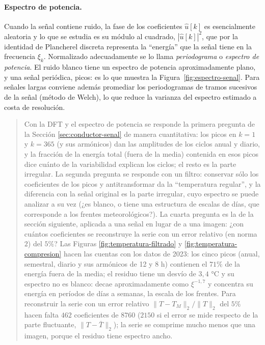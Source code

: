 \documentclass[12pt, a4paper]{amsbook}
\theoremstyle{remark}
\theoremstyle{definition}
\numberwithin{section}{chapter}
\numberwithin{subsection}{section}
\numberwithin{equation}{section}
\numberwithin{figure}{chapter}
\newenvironment{volvemos}[1]{\medskip\par\noindent\begin{quote}\noindent{\bf Volvemos al problema: #1.}\par\smallskip}{\end{quote}\medskip}
\begin{document}
\paragraph{Espectro de potencia.} Cuando la señal contiene ruido, la fase de los coeficientes $\hat u[k]$ es esencialmente aleatoria y lo que se estudia es su módulo al cuadrado, $|\hat u[k]|^2$, que por la identidad de Plancherel discreta representa la ``energía'' que la señal tiene en la frecuencia $\xi_k$. Normalizado adecuadamente se lo llama \emph{periodograma} o \emph{espectro de potencia}. El ruido blanco tiene un espectro de potencia aproximadamente plano, y una señal periódica, picos: es lo que muestra la Figura~\ref{fig:espectro-senal}. Para señales largas conviene además promediar los periodogramas de tramos sucesivos de la señal (método de Welch), lo que reduce la varianza del espectro estimado a costa de resolución.

\begin{volvemos}{la señal de temperatura}
Con la DFT y el espectro de potencia se responde la primera pregunta de la Sección \ref{sec:conductor-senal} de manera cuantitativa: los picos en $k=1$ y $k=365$ (y sus armónicos) dan las amplitudes de los ciclos anual y diario, y la fracción de la energía total (fuera de la media) contenida en esos picos dice cuánto de la variabilidad explican los ciclos; el resto es la parte irregular. La segunda pregunta se responde con un filtro: conservar sólo los coeficientes de los picos y antitransformar da la ``temperatura regular'', y la diferencia con la señal original es la parte irregular, cuyo espectro se puede analizar a su vez (¿es blanco, o tiene una estructura de escalas de días, que corresponde a los frentes meteorológicos?). La cuarta pregunta es la de la sección siguiente, aplicada a una señal en lugar de a una imagen: ¿con cuántos coeficientes se reconstruye la serie con un error relativo (en norma $2$) del $5\%$?
Las Figuras \ref{fig:temperatura-filtrado} y \ref{fig:temperatura-compresion} hacen las cuentas con los datos de 2023: los cinco picos (anual, semestral, diario y sus armónicos de 12 y 8 h) contienen el $71\%$ de la energía fuera de la media; el residuo tiene un desvío de $3{,}4$ °C y su espectro no es blanco: decae aproximadamente como $\xi^{-1{,}7}$ y concentra su energía en períodos de días a semanas, la escala de los frentes. Para reconstruir la serie con un error relativo $\|T-T_M\|_2/\|T\|_2$ del $5\%$ hacen falta $462$ coeficientes de $8760$ ($2150$ si el error se mide respecto de la parte fluctuante, $\|T-\bar T\|_2$); la serie se comprime mucho menos que una imagen, porque el residuo tiene espectro ancho.
\end{volvemos}
\end{document}
